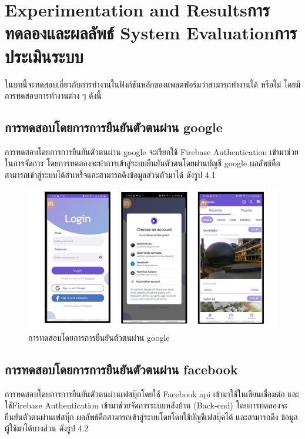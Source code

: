 \chapter{\ifproject%
\ifenglish Experimentation and Results\else การทดลองและผลลัพธ์\fi
\else%
\ifenglish System Evaluation\else การประเมินระบบ\fi
\fi}

ในบทนี้จะทดสอบเกี่ยวกับการทำงานในฟังก์ชันหลักของแพลตฟอร์มว่าสามารถทำงานได้
หรือไม่ โดยมีการทดสอบการทำงานต่าง ๆ ดังนี้

\section{การทดสอบโดยการการยืนยันตัวตนผ่าน google}
    การทดสอบโดยการการยืนยันตัวตนผ่าน google จะเรียกใช้ Firebase Authentication เข้ามาช่วยในการจัดการ
โดยการทดลองจะทำการเข้าสู่ระบบยืนยันตัวตนโดยผ่านบัญชี google ผลลัพธ์คือสามารถเข้าสู่ระบบได้สำเหร็จและสามารถดึงข้อมูลส่วนตัวมาได้
ดังรูป 4.1 
    \begin{figure}
    \begin{center}
      \includegraphics[width=1\textwidth]{./image/testing/Slide1.JPG}
    \end{center}
    \caption[การทดสอบโดยการการยืนยันตัวตนผ่าน google]{การทดสอบโดยการการยืนยันตัวตนผ่าน google}
    \end{figure}

\section{การทดสอบโดยการการยืนยันตัวตนผ่าน facebook}
    การทดสอบโดยการการยืนยันตัวตนผ่านเฟสบุ๊กโดยใช้ Facebook api เข้ามาใช้ในเขียนเชื่อมต่อ และใช้Firebase Authentication 
เข้ามาช่วยจัดการระบบหลังบ้าน (Back-end) โดยการทดลองจะยืนยันตัวตนผ่านเฟสบุ๊ก ผลลัพธ์คือสามารถเข้าสู่ระบบโดยโดยใช้บัญชีเฟสบุ๊คได้ และสามารถดึง
ข้อมูลผู้ใช้มาได้บางส่วน ดังรูป 4.2

